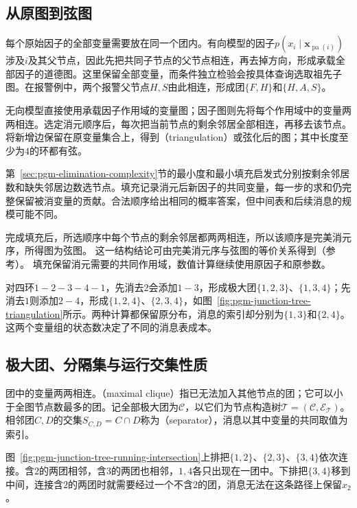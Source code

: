 \subsection{从原图到弦图}
\label{sec:pgm-junction-tree-chordalization}

每个原始因子的全部变量需要放在同一个团内。有向模型的因子$p(x_i\mid\bm{x}_{\operatorname{pa}(i)})$涉及$i$及其父节点，因此先把共同子节点的父节点相连，再去掉方向，形成承载全部因子的道德图。这里保留全部变量，而条件独立检验会按具体查询选取祖先子图。在报警例中，两个报警父节点$H,S$由此相连，形成团$\{F,H\}$和$\{H,A,S\}$。

无向模型直接使用承载因子作用域的变量图；因子图则先将每个作用域中的变量两两相连。选定消元顺序后，每次把当前节点的剩余邻居全部相连，再移去该节点。将新增边保留在原变量集合上，得到（triangulation）或弦化后的图；其中长度至少为$4$的环都有弦。

第~\ref{sec:pgm-elimination-complexity}节的最小度和最小填充启发式分别按剩余邻居数和缺失邻居边数选节点。填充记录消元后新因子的共同变量，每一步的求和仍完整保留被消变量的贡献。合法顺序给出相同的概率答案，但中间表和后续消息的规模可能不同。

完成填充后，所选顺序中每个节点的剩余邻居都两两相连，所以该顺序是完美消元序，所得图为弦图。
这一结构结论可由完美消元序与弦图的等价关系得到（参考）。
填充保留消元需要的共同作用域，数值计算继续使用原因子和原参数。

对四环$1-2-3-4-1$，先消去$2$会添加$1-3$，形成极大团$\{1,2,3\}$、$\{1,3,4\}$；先消去$1$则添加$2-4$，形成$\{1,2,4\}$、$\{2,3,4\}$，如图~\ref{fig:pgm-junction-tree-triangulation}所示。两种计算都保留原分布，消息的索引却分别为$\{1,3\}$和$\{2,4\}$。这两个变量组的状态数决定了不同的消息表成本。

\subsection{极大团、分隔集与运行交集性质}
\label{sec:pgm-junction-tree-running-intersection}

团中的变量两两相连。（maximal clique）指已无法加入其他节点的团；它可以小于全图节点数最多的团。记全部极大团为$\mathcal C$，以它们为节点构造树$\mathcal T=(\mathcal C,\mathcal E_{\mathcal T})$。相邻团$C,D$的交集$S_{C,D}=C\cap D$称为（separator），消息以其中变量的共同取值为索引。

图~\ref{fig:pgm-junction-tree-running-intersection}上排把$\{1,2\}$、$\{2,3\}$、$\{3,4\}$依次连接。含$2$的两团相邻，含$3$的两团也相邻，$1,4$各只出现在一团中。下排把$\{3,4\}$移到中间，连接含$2$的两团时就需要经过一个不含$2$的团，消息无法在这条路径上保留$x_2$。

